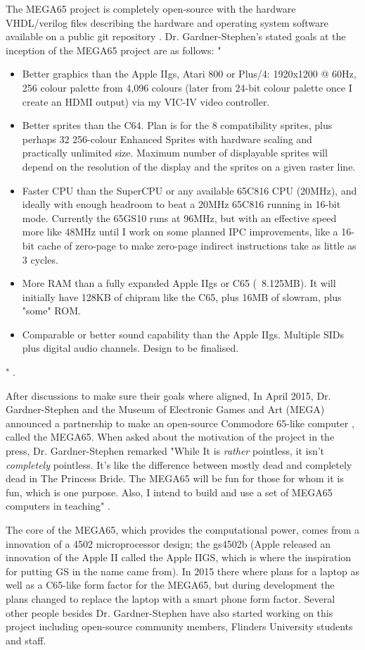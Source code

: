 The MEGA65 project is completely open-source with the hardware VHDL/verilog files describing the hardware and operating system software available on a public git repository 
\cite{RN17}. Dr. Gardner-Stephen's stated goals at the inception of the MEGA65 project are as follows: 
" \begin{itemize}
\item Better graphics than the Apple IIgs, Atari 800 or Plus/4: 1920x1200 @ 60Hz, 256 colour palette from 4,096 colours (later from 24-bit colour palette once I create an HDMI output) via my VIC-IV video controller.
 \item    Better sprites than the C64.  Plan is for the 8 compatibility sprites, plus perhaps 32 256-colour Enhanced Sprites with hardware scaling and practically unlimited size.  Maximum number of displayable sprites will depend on the resolution of the display and the sprites on a given raster line.
 \item    Faster CPU than the SuperCPU or any available 65C816 CPU (20MHz), and ideally with enough headroom to beat a 20MHz 65C816 running in 16-bit mode.  Currently the 65GS10 runs at 96MHz, but with an effective speed more like 48MHz until I work on some planned IPC improvements, like a 16-bit cache of zero-page to make zero-page indirect instructions take as little as 3 cycles.
 \item    More RAM than a fully expanded Apple IIgs or C65 (~8.125MB).  It will initially have 128KB of chipram like the C65, plus 16MB of slowram, plus "some" ROM.
 \item    Comparable or better sound capability than the Apple IIgs.  Multiple SIDs plus digital audio channels.  Design to be finalised.
\end{itemize} " \cite{RN45}.

After discussions to make sure their goals where aligned, In April 2015, Dr. Gardner-Stephen and the Museum of Electronic Games and Art (MEGA) announced a partnership to make an open-source Commodore 65-like computer 
\cite{RN47}, called the MEGA65. When asked about the motivation of the project in the press, Dr. Gardner-Stephen remarked "While It is \textit{rather} pointless, it isn't \textit{completely} pointless. It's like the difference between mostly dead and completely dead in The Princess Bride.  The MEGA65 will be fun for those for whom it is fun, which is one purpose.  Also, I intend to build and use a set of MEGA65 computers in teaching" 
\cite{RN48}.

The core of  the MEGA65, which provides the computational power, comes from a innovation of a 4502 microprocessor design; the gs4502b (Apple released an innovation of the Apple II called the Apple IIGS, which is where the inspiration for putting GS in the name came from). In 2015 there where plans for a laptop as well as a C65-like form factor for the MEGA65, but during development the plans changed to replace the laptop with a smart phone form factor. Several other people besides Dr. Gardner-Stephen have also started working on this project including open-source community members, Flinders University students and staff. 

